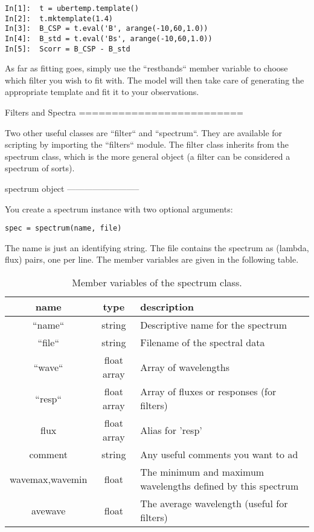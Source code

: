 \begin{verbatim}
In[1]:  t = ubertemp.template()
In[2]:  t.mktemplate(1.4)
In[3]:  B_CSP = t.eval('B', arange(-10,60,1.0))
In[4]:  B_std = t.eval('Bs', arange(-10,60,1.0))
In[5]:  Scorr = B_CSP - B_std
\end{verbatim}

As far as fitting goes, simply use the ``restbands`` member variable
to choose which filter you wish to fit with. The model will then take
care of generating the appropriate template and fit it to your observations.


Filters and Spectra\label{sec:Filters-and-Spectra}
=========================

Two other useful classes are ``filter`` and ``spectrum``.
They are available for scripting by importing the ``filters``
module. The filter class inherits from the spectrum class, which is
the more general object (a filter can be considered a spectrum of
sorts).


spectrum object
--------------------------

You create a spectrum instance with two optional arguments:

\begin{verbatim}
spec = spectrum(name, file)
\end{verbatim}


The name is just an identifying string. The file contains the spectrum
as (lambda, flux) pairs, one per line. The member variables are given
in the following table.

\begin{table}
\begin{tabular}{|c|c|>{\centering}p{4in}|}
\hline 
name & type & description\tabularnewline
\hline 
\hline 
``name`` & string & Descriptive name for the spectrum\tabularnewline
\hline 
``file`` & string & Filename of the spectral data\tabularnewline
\hline 
``wave`` & float array & Array of wavelengths\tabularnewline
\hline 
``resp`` & float array & Array of fluxes or responses (for filters)\tabularnewline
\hline 
flux & float array & Alias for 'resp'\tabularnewline
\hline 
comment & string & Any useful comments you want to ad\tabularnewline
\hline 
wavemax,wavemin & float & The minimum and maximum wavelengths defined by this spectrum\tabularnewline
\hline 
avewave & float & The average wavelength (useful for filters)\tabularnewline
\hline 
\end{tabular}

\caption{Member variables of the spectrum class.}
\end{table}



